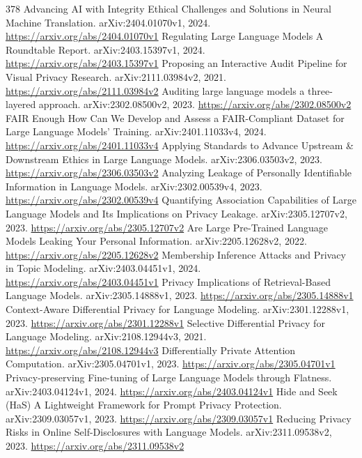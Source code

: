 \documentclass[11pt]{article}
\begin{document}
\begin{thebibliography}{378}
 Advancing AI with Integrity Ethical Challenges and Solutions in Neural Machine Translation. arXiv:2404.01070v1, 2024. \url{https://arxiv.org/abs/2404.01070v1}
 Regulating Large Language Models A Roundtable Report. arXiv:2403.15397v1, 2024. \url{https://arxiv.org/abs/2403.15397v1}
 Proposing an Interactive Audit Pipeline for Visual Privacy Research. arXiv:2111.03984v2, 2021. \url{https://arxiv.org/abs/2111.03984v2}
 Auditing large language models a three-layered approach. arXiv:2302.08500v2, 2023. \url{https://arxiv.org/abs/2302.08500v2}
 FAIR Enough How Can We Develop and Assess a FAIR-Compliant Dataset for Large Language Models' Training. arXiv:2401.11033v4, 2024. \url{https://arxiv.org/abs/2401.11033v4}
 Applying Standards to Advance Upstream \& Downstream Ethics in Large Language Models. arXiv:2306.03503v2, 2023. \url{https://arxiv.org/abs/2306.03503v2}
 Analyzing Leakage of Personally Identifiable Information in Language Models. arXiv:2302.00539v4, 2023. \url{https://arxiv.org/abs/2302.00539v4}
 Quantifying Association Capabilities of Large Language Models and Its Implications on Privacy Leakage. arXiv:2305.12707v2, 2023. \url{https://arxiv.org/abs/2305.12707v2}
 Are Large Pre-Trained Language Models Leaking Your Personal Information. arXiv:2205.12628v2, 2022. \url{https://arxiv.org/abs/2205.12628v2}
 Membership Inference Attacks and Privacy in Topic Modeling. arXiv:2403.04451v1, 2024. \url{https://arxiv.org/abs/2403.04451v1}
 Privacy Implications of Retrieval-Based Language Models. arXiv:2305.14888v1, 2023. \url{https://arxiv.org/abs/2305.14888v1}
 Context-Aware Differential Privacy for Language Modeling. arXiv:2301.12288v1, 2023. \url{https://arxiv.org/abs/2301.12288v1}
 Selective Differential Privacy for Language Modeling. arXiv:2108.12944v3, 2021. \url{https://arxiv.org/abs/2108.12944v3}
 Differentially Private Attention Computation. arXiv:2305.04701v1, 2023. \url{https://arxiv.org/abs/2305.04701v1}
 Privacy-preserving Fine-tuning of Large Language Models through Flatness. arXiv:2403.04124v1, 2024. \url{https://arxiv.org/abs/2403.04124v1}
 Hide and Seek (HaS) A Lightweight Framework for Prompt Privacy Protection. arXiv:2309.03057v1, 2023. \url{https://arxiv.org/abs/2309.03057v1}
 Reducing Privacy Risks in Online Self-Disclosures with Language Models. arXiv:2311.09538v2, 2023. \url{https://arxiv.org/abs/2311.09538v2}

\end{thebibliography}
\end{document}
